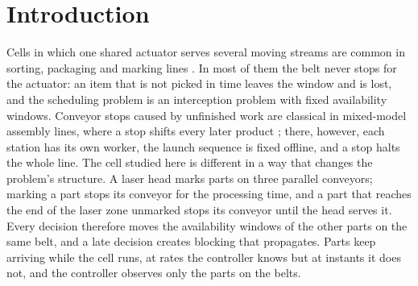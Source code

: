 \documentclass[11pt,a4paper]{article}
\theoremstyle{plain}
\theoremstyle{definition}
\theoremstyle{remark}
\begin{document}
\section{Introduction}
Cells in which one shared actuator serves several moving streams are common in sorting,
packaging and marking lines \cite{S01_Mattone2000,S02_Han2020,S03_Nielsen2023,S04_Schettini2023}.
In most of them the belt never stops for the actuator: an item that is not picked in time
leaves the window and is lost, and the scheduling problem is an interception problem with
fixed availability windows. Conveyor stops caused by unfinished work are classical in
mixed-model assembly lines, where a stop shifts every later product
\cite{Xiaobo2000,Tamura2011}; there, however, each station has its own worker, the launch
sequence is fixed offline, and a stop halts the whole line. The cell studied here is
different in a way that changes the problem's structure. A laser head marks parts on three
parallel conveyors; marking a part stops its conveyor for the processing time, and a part
that reaches the end of the laser zone unmarked stops its conveyor until the head serves
it. Every decision therefore moves the availability windows of the other parts on the same
belt, and a late decision creates blocking that propagates. Parts keep arriving while the
cell runs, at rates the controller knows but at instants it does not, and the controller
observes only the parts on the belts.
\end{document}
